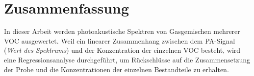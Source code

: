 







\section{Zusammenfassung}
In dieser Arbeit werden photoakustische Spektren von Gasgemischen mehrerer \gls{VOC} ausgewertet.
Weil ein linearer Zusammenhang zwischen dem \gls{PA}-Signal (\emph{Wert des Spektrums}) und der Konzentration der einzelnen \gls{VOC} besteht, wird eine Regressionsanalyse durchgeführt, um Rückschlüsse auf die Zusammensetzung der Probe und die Konzentrationen der einzelnen Bestandteile zu erhalten.

